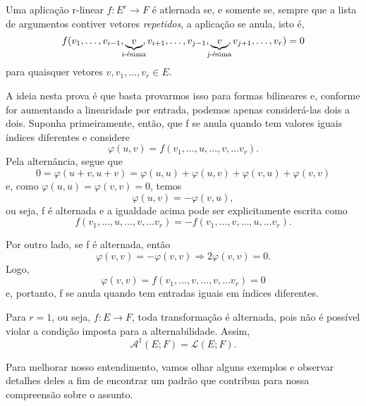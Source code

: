 \documentclass[../differential_forms.tex]{subfiles}
\begin{document}
\begin{prop*}
	Uma aplicação r-linear \(f:E^{r}\rightarrow F\) é atlernada se, e somente se, sempre que a lista de argumentos contiver vetores
	\textit{repetidos}, a aplicação se anula, isto é,
	\[
		f(v_1, \dotsc , v_{i-1}, \underbrace{v}_{\mathclap{\text{i-ésima}}}, v_{i+1}, \dotsc , v_{j-1}, \underbrace{v}_{\mathclap{\text{j-ésima}}}, v_{j+1}, \dotsc , v_r) = 0
	\]
	para quaisquer vetores \(v, v_1, \dotsc , v_r\in E.\)
\end{prop*}
\begin{proof*}
	A ideia nesta prova é que basta provarmos isso para formas bilineares e, conforme for aumentando a linearidade por entrada, podemos
	apenas considerá-las dois a dois.
	Suponha primeiramente, então, que f se anula quando tem valores iguais índices diferentes e considere
	\[
		\varphi (u, v)=f(v_1,\dotsc , u,\dotsc ,v,\dotsc v_r).
	\]
	Pela alternância, segue que
	\[
		0=\varphi (u+v, u+v) = \varphi(u, u)+\varphi (u, v)+\varphi (v, u)+\varphi (v, v)
	\]
	e, como \(\varphi (u, u)=\varphi (v, v)=0\), temos
	\[
		\varphi (u,v) = -\varphi (v, u),
	\]
	ou seja, f é alternada e a igualdade acima pode ser explicitamente escrita como
	\[
		f(v_1,\dotsc , u,\dotsc ,v,\dotsc v_r) = -f(v_1,\dotsc , v,\dotsc ,u,\dotsc v_r).
	\]

	Por outro lado, se f é alternada, então
	\[
		\varphi (v, v)=-\varphi (v, v) \Rightarrow 2\varphi (v, v)=0.
	\]
	Logo,
	\[
		\varphi (v, v)=f(v_1,\dotsc , v,\dotsc ,v,\dotsc v_r) = 0
	\]
	e, portanto, f se anula quando tem entradas iguais em índices diferentes. \qedsymbol
\end{proof*}

\begin{example}
	Para \(r=1\), ou seja, \(f:E\rightarrow F\), toda transformação é alternada, pois não é possível violar a condição imposta para
	a alternabilidade. Assim,
	\[
		\mathcal{A}^{1}(E; F)=\mathcal{L}(E; F).
	\]
\end{example}
Para melhorar nosso entendimento, vamos olhar alguns exemplos e observar detalhes deles a fim de encontrar um padrão que contribua
para nossa compreensão sobre o assunto.
\end{document}
